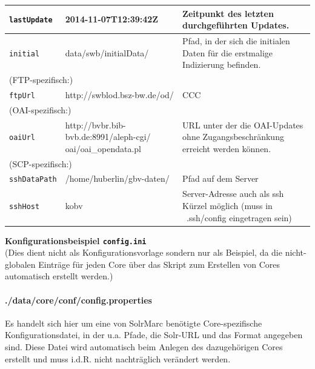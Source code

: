 \documentclass[10pt]{article}
\begin{document}
\begin{center}
\begin{longtable}{| l | p{5cm} | p{5cm} | }
	\texttt{lastUpdate} & 2014-11-07T12:39:42Z & Zeitpunkt des letzten durchgeführten Updates.  \\ \hline
	
	\texttt{initial} & data/swb/initialData/ & Pfad, in der sich die initialen Daten für die erstmalige Indizierung befinden. \\ \hline
	
	
	\multicolumn{3}{l}{(FTP-spezifisch:)} \\ \hline
	
	\texttt{ftpUrl} & http://swblod.bsz-bw.de/od/ & CCC \\ \hline
	
	
	\multicolumn{3}{l}{(OAI-spezifisch:)} \\ \hline
	
	\texttt{oaiUrl} & http://bvbr.bib-bvb.de:8991/aleph-cgi/
	oai/oai\_opendata.pl & URL unter der die OAI-Updates ohne Zugangsbeschränkung erreicht werden können. \\ \hline
	

	\multicolumn{3}{l}{(SCP-spezifisch:)} \\ \hline
	
	\texttt{sshDataPath} & /home/huberlin/gbv-daten/ & Pfad auf dem Server \\ \hline
	
	\texttt{sshHost} & kobv & Server-Adresse auch als ssh Kürzel möglich (muss in ~.ssh/config eingetragen sein) \\ \hline
	
	
\end{longtable}
\end{center}

\lstset{
	numbers=left, 
	numberstyle=\small, 
	numbersep=8pt, 
	frame = single, 
	language=Pascal, 
	framexleftmargin=15pt,
	breaklines=true
}
\textbf{Konfigurationsbeispiel \texttt{config.ini}} \\
(Dies dient nicht als Konfigurationsvorlage sondern nur als Beispiel, da die nicht-globalen Einträge für jeden Core über das Skript zum Erstellen von Cores automatisch erstellt werden.)



\paragraph{./data/core/conf/config.properties}
Es handelt sich hier um eine von SolrMarc benötigte Core-spezifische Konfigurationsdatei, in der u.a. Pfade, die Solr-URL und das Format angegeben sind. Diese Datei wird automatisch beim Anlegen des dazugehörigen Cores erstellt und muss i.d.R. nicht nachträglich verändert werden. \\ \\
\end{document}
